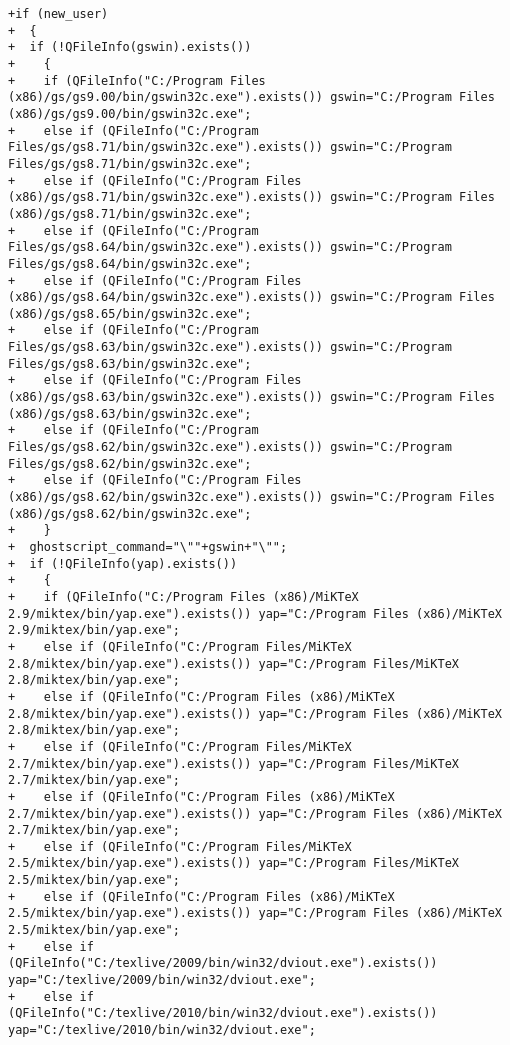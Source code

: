 \documentclass[10pt,a4paper,landscape]{report}
\begin{document}
\begin{itemize}
\begin{verbatim}
+if (new_user)
+  {
+  if (!QFileInfo(gswin).exists())
+    {
+    if (QFileInfo("C:/Program Files (x86)/gs/gs9.00/bin/gswin32c.exe").exists()) gswin="C:/Program Files (x86)/gs/gs9.00/bin/gswin32c.exe";
+    else if (QFileInfo("C:/Program Files/gs/gs8.71/bin/gswin32c.exe").exists()) gswin="C:/Program Files/gs/gs8.71/bin/gswin32c.exe";
+    else if (QFileInfo("C:/Program Files (x86)/gs/gs8.71/bin/gswin32c.exe").exists()) gswin="C:/Program Files (x86)/gs/gs8.71/bin/gswin32c.exe";
+    else if (QFileInfo("C:/Program Files/gs/gs8.64/bin/gswin32c.exe").exists()) gswin="C:/Program Files/gs/gs8.64/bin/gswin32c.exe";
+    else if (QFileInfo("C:/Program Files (x86)/gs/gs8.64/bin/gswin32c.exe").exists()) gswin="C:/Program Files (x86)/gs/gs8.65/bin/gswin32c.exe";
+    else if (QFileInfo("C:/Program Files/gs/gs8.63/bin/gswin32c.exe").exists()) gswin="C:/Program Files/gs/gs8.63/bin/gswin32c.exe";
+    else if (QFileInfo("C:/Program Files (x86)/gs/gs8.63/bin/gswin32c.exe").exists()) gswin="C:/Program Files (x86)/gs/gs8.63/bin/gswin32c.exe";
+    else if (QFileInfo("C:/Program Files/gs/gs8.62/bin/gswin32c.exe").exists()) gswin="C:/Program Files/gs/gs8.62/bin/gswin32c.exe";
+    else if (QFileInfo("C:/Program Files (x86)/gs/gs8.62/bin/gswin32c.exe").exists()) gswin="C:/Program Files (x86)/gs/gs8.62/bin/gswin32c.exe";
+    }
+  ghostscript_command="\""+gswin+"\"";
+  if (!QFileInfo(yap).exists())
+    {
+    if (QFileInfo("C:/Program Files (x86)/MiKTeX 2.9/miktex/bin/yap.exe").exists()) yap="C:/Program Files (x86)/MiKTeX 2.9/miktex/bin/yap.exe";
+    else if (QFileInfo("C:/Program Files/MiKTeX 2.8/miktex/bin/yap.exe").exists()) yap="C:/Program Files/MiKTeX 2.8/miktex/bin/yap.exe";
+    else if (QFileInfo("C:/Program Files (x86)/MiKTeX 2.8/miktex/bin/yap.exe").exists()) yap="C:/Program Files (x86)/MiKTeX 2.8/miktex/bin/yap.exe";
+    else if (QFileInfo("C:/Program Files/MiKTeX 2.7/miktex/bin/yap.exe").exists()) yap="C:/Program Files/MiKTeX 2.7/miktex/bin/yap.exe";
+    else if (QFileInfo("C:/Program Files (x86)/MiKTeX 2.7/miktex/bin/yap.exe").exists()) yap="C:/Program Files (x86)/MiKTeX 2.7/miktex/bin/yap.exe";
+    else if (QFileInfo("C:/Program Files/MiKTeX 2.5/miktex/bin/yap.exe").exists()) yap="C:/Program Files/MiKTeX 2.5/miktex/bin/yap.exe";
+    else if (QFileInfo("C:/Program Files (x86)/MiKTeX 2.5/miktex/bin/yap.exe").exists()) yap="C:/Program Files (x86)/MiKTeX 2.5/miktex/bin/yap.exe";
+    else if (QFileInfo("C:/texlive/2009/bin/win32/dviout.exe").exists()) yap="C:/texlive/2009/bin/win32/dviout.exe";
+    else if (QFileInfo("C:/texlive/2010/bin/win32/dviout.exe").exists()) yap="C:/texlive/2010/bin/win32/dviout.exe";

\end{verbatim}
\end{itemize}
\end{document}
